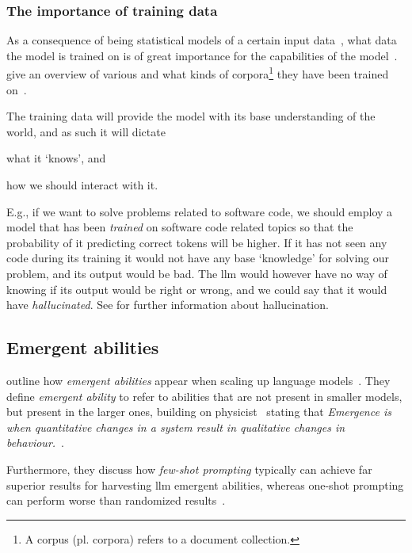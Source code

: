 \subsubsection{The importance of training data}
As a consequence of  being statistical models of a certain input
data~\cite[1]{llmSurvey}, what data the model is trained on is of great
importance for the capabilities of the model~\cite[6]{llmSurvey}.
\citeauthor{llmSurvey} give an overview of various  and what
kinds of corpora\footnote{A corpus (pl. corpora) refers to a document
    collection.} they have been trained on~\cite[11-14]{llmSurvey}.

The training data will provide the model with its base understanding of the
world, and as such it will dictate \begin{inparaenum}
    \item what it `knows', and
    \item how we should interact with it.
\end{inparaenum}
E.g., if we want to solve problems related to software code, we should employ a
model that has been \textit{trained} on software code related topics so that the
probability of it predicting correct tokens will be higher. If it has not seen
any code during its training it would not have any base `knowledge' for solving
our problem, and its output would be bad. The \acrshort{llm} would however have
no way of knowing if its output would be right or wrong, and we could say that
it would have \textit{hallucinated}.
See  for further information
about hallucination.


\subsection{Emergent abilities}\label{sec:emergentAbilities}

\citeauthor{emergentabilitiesLLM} outline how \textit{emergent abilities} appear
when scaling up language models~\cite[1]{emergentabilitiesLLM}. They define
\textit{emergent ability} to refer to abilities that are not present in smaller
models, but present in the larger ones\cite[1]{emergentabilitiesLLM}, building
on physicist~\citeauthor{anderson1972more} stating that \textit{Emergence is
    when quantitative changes in a system result in qualitative changes in
    behaviour.}~\cite[2]{emergentabilitiesLLM}.

Furthermore, they discuss how \textit{few-shot prompting} typically can achieve
far superior results for harvesting \acrshort{llm} emergent abilities, whereas
one-shot prompting can perform worse than randomized
results~\cite[3-4]{emergentabilitiesLLM}.

